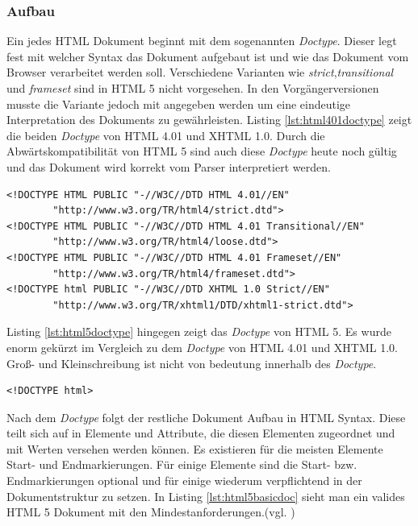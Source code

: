 \subsubsection{Aufbau} Ein jedes HTML Dokument beginnt mit dem sogenannten \textit{Doctype}. Dieser legt fest mit welcher Syntax das Dokument aufgebaut ist und wie das Dokument vom Browser verarbeitet werden soll. Verschiedene Varianten wie \textit{strict},\textit{transitional} und \textit{frameset} sind in HTML 5 nicht vorgesehen. In den Vorgängerversionen musste die Variante jedoch mit angegeben werden um eine eindeutige Interpretation des Dokuments zu gewährleisten. Listing \ref{lst:html401doctype} zeigt die beiden \textit{Doctype} von HTML 4.01 und XHTML 1.0. Durch die Abwärtskompatibilität von HTML 5 sind auch diese \textit{Doctype} heute noch gültig und das Dokument wird korrekt vom Parser interpretiert werden.
    
    \vspace{1em}
    \lstset{language=html}
	\begin{lstlisting}[frame=htrbl, caption=(X)HTML4.01 \textit{doctype}-Element, label=lst:html401doctype]
<!DOCTYPE HTML PUBLIC "-//W3C//DTD HTML 4.01//EN"
        "http://www.w3.org/TR/html4/strict.dtd">
<!DOCTYPE HTML PUBLIC "-//W3C//DTD HTML 4.01 Transitional//EN"
        "http://www.w3.org/TR/html4/loose.dtd">
<!DOCTYPE HTML PUBLIC "-//W3C//DTD HTML 4.01 Frameset//EN"
        "http://www.w3.org/TR/html4/frameset.dtd">        
<!DOCTYPE html PUBLIC "-//W3C//DTD XHTML 1.0 Strict//EN"
        "http://www.w3.org/TR/xhtml1/DTD/xhtml1-strict.dtd">    
	\end{lstlisting}
	
Listing \ref{lst:html5doctype}	hingegen zeigt das \textit{Doctype} von HTML 5. Es wurde enorm gekürzt im Vergleich zu dem \textit{Doctype} von HTML 4.01 und XHTML 1.0. Groß- und Kleinschreibung ist nicht von bedeutung innerhalb des \textit{Doctype}. 

    \vspace{1em}
    \lstset{language=html}
	\begin{lstlisting}[frame=htrbl, caption=HTML 5 \textit{doctype}-Element, label=lst:html5doctype]
<!DOCTYPE html>
	\end{lstlisting}		
	
Nach dem \textit{Doctype} folgt der restliche Dokument Aufbau in HTML Syntax. Diese teilt sich auf in Elemente und Attribute, die diesen Elementen zugeordnet und mit Werten versehen werden können. Es existieren für die meisten Elemente Start- und Endmarkierungen. Für einige Elemente sind die Start- bzw. Endmarkierungen optional und für einige wiederum verpflichtend in der Dokumentstruktur zu setzen. In Listing \ref{lst:html5basicdoc} sieht man ein valides HTML 5 Dokument mit den Mindestanforderungen.(vgl. \cite[S.58]{KronHTML2011})

